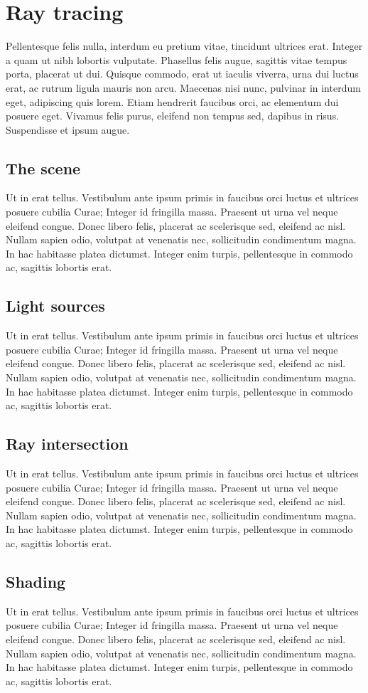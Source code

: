 \chapter{Ray tracing}
Pellentesque felis nulla, interdum eu pretium vitae, tincidunt ultrices erat. Integer a quam ut nibh lobortis vulputate. Phasellus felis augue, sagittis vitae tempus porta, placerat ut dui. Quisque commodo, erat ut iaculis viverra, urna dui luctus erat, ac rutrum ligula mauris non arcu. Maecenas nisi nunc, pulvinar in interdum eget, adipiscing quis lorem. Etiam hendrerit faucibus orci, ac elementum dui posuere eget. Vivamus felis purus, eleifend non tempus sed, dapibus in risus. Suspendisse et ipsum augue.
\section{The scene}
Ut in erat tellus. Vestibulum ante ipsum primis in faucibus orci luctus et ultrices posuere cubilia Curae; Integer id fringilla massa. Praesent ut urna vel neque eleifend congue. Donec libero felis, placerat ac scelerisque sed, eleifend ac nisl. Nullam sapien odio, volutpat at venenatis nec, sollicitudin condimentum magna. In hac habitasse platea dictumst. Integer enim turpis, pellentesque in commodo ac, sagittis lobortis erat.
\section{Light sources}
Ut in erat tellus. Vestibulum ante ipsum primis in faucibus orci luctus et ultrices posuere cubilia Curae; Integer id fringilla massa. Praesent ut urna vel neque eleifend congue. Donec libero felis, placerat ac scelerisque sed, eleifend ac nisl. Nullam sapien odio, volutpat at venenatis nec, sollicitudin condimentum magna. In hac habitasse platea dictumst. Integer enim turpis, pellentesque in commodo ac, sagittis lobortis erat.
\section{Ray intersection}
Ut in erat tellus. Vestibulum ante ipsum primis in faucibus orci luctus et ultrices posuere cubilia Curae; Integer id fringilla massa. Praesent ut urna vel neque eleifend congue. Donec libero felis, placerat ac scelerisque sed, eleifend ac nisl. Nullam sapien odio, volutpat at venenatis nec, sollicitudin condimentum magna. In hac habitasse platea dictumst. Integer enim turpis, pellentesque in commodo ac, sagittis lobortis erat.
\section{Shading}
Ut in erat tellus. Vestibulum ante ipsum primis in faucibus orci luctus et ultrices posuere cubilia Curae; Integer id fringilla massa. Praesent ut urna vel neque eleifend congue. Donec libero felis, placerat ac scelerisque sed, eleifend ac nisl. Nullam sapien odio, volutpat at venenatis nec, sollicitudin condimentum magna. In hac habitasse platea dictumst. Integer enim turpis, pellentesque in commodo ac, sagittis lobortis erat.
